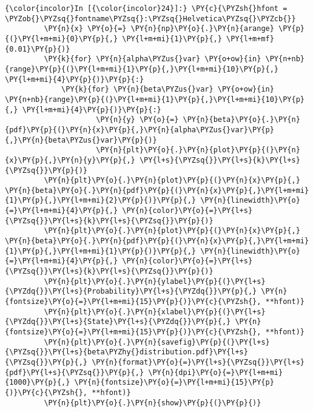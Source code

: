     \begin{Verbatim}[commandchars=\\\{\}]
{\color{incolor}In [{\color{incolor}24}]:} \PY{c}{\PYZsh{}hfont = \PYZob{}\PYZsq{}fontname\PYZsq{}:\PYZsq{}Helvetica\PYZsq{}\PYZcb{}}
         \PY{n}{x} \PY{o}{=} \PY{n}{np}\PY{o}{.}\PY{n}{arange} \PY{p}{(}\PY{l+m+mi}{0}\PY{p}{,} \PY{l+m+mi}{1}\PY{p}{,} \PY{l+m+mf}{0.01}\PY{p}{)}
         \PY{k}{for} \PY{n}{alpha\PYZus{}var} \PY{o+ow}{in} \PY{n+nb}{range}\PY{p}{(}\PY{l+m+mi}{1}\PY{p}{,}\PY{l+m+mi}{10}\PY{p}{,} \PY{l+m+mi}{4}\PY{p}{)}\PY{p}{:}
             \PY{k}{for} \PY{n}{beta\PYZus{}var} \PY{o+ow}{in} \PY{n+nb}{range}\PY{p}{(}\PY{l+m+mi}{1}\PY{p}{,}\PY{l+m+mi}{10}\PY{p}{,} \PY{l+m+mi}{4}\PY{p}{)}\PY{p}{:}
                     \PY{n}{y} \PY{o}{=} \PY{n}{beta}\PY{o}{.}\PY{n}{pdf}\PY{p}{(}\PY{n}{x}\PY{p}{,}\PY{n}{alpha\PYZus{}var}\PY{p}{,}\PY{n}{beta\PYZus{}var}\PY{p}{)}
                     \PY{n}{plt}\PY{o}{.}\PY{n}{plot}\PY{p}{(}\PY{n}{x}\PY{p}{,}\PY{n}{y}\PY{p}{,} \PY{l+s}{\PYZsq{}}\PY{l+s}{k}\PY{l+s}{\PYZsq{}}\PY{p}{)}
         \PY{n}{plt}\PY{o}{.}\PY{n}{plot}\PY{p}{(}\PY{n}{x}\PY{p}{,} \PY{n}{beta}\PY{o}{.}\PY{n}{pdf}\PY{p}{(}\PY{n}{x}\PY{p}{,}\PY{l+m+mi}{1}\PY{p}{,}\PY{l+m+mi}{2}\PY{p}{)}\PY{p}{,} \PY{n}{linewidth}\PY{o}{=}\PY{l+m+mi}{4}\PY{p}{,} \PY{n}{color}\PY{o}{=}\PY{l+s}{\PYZsq{}}\PY{l+s}{k}\PY{l+s}{\PYZsq{}}\PY{p}{)}
         \PY{n}{plt}\PY{o}{.}\PY{n}{plot}\PY{p}{(}\PY{n}{x}\PY{p}{,} \PY{n}{beta}\PY{o}{.}\PY{n}{pdf}\PY{p}{(}\PY{n}{x}\PY{p}{,}\PY{l+m+mi}{1}\PY{p}{,}\PY{l+m+mi}{1}\PY{p}{)}\PY{p}{,} \PY{n}{linewidth}\PY{o}{=}\PY{l+m+mi}{4}\PY{p}{,} \PY{n}{color}\PY{o}{=}\PY{l+s}{\PYZsq{}}\PY{l+s}{k}\PY{l+s}{\PYZsq{}}\PY{p}{)}
         \PY{n}{plt}\PY{o}{.}\PY{n}{ylabel}\PY{p}{(}\PY{l+s}{\PYZdq{}}\PY{l+s}{Probability}\PY{l+s}{\PYZdq{}}\PY{p}{,} \PY{n}{fontsize}\PY{o}{=}\PY{l+m+mi}{15}\PY{p}{)}\PY{c}{\PYZsh{}, **hfont)}
         \PY{n}{plt}\PY{o}{.}\PY{n}{xlabel}\PY{p}{(}\PY{l+s}{\PYZdq{}}\PY{l+s}{State}\PY{l+s}{\PYZdq{}}\PY{p}{,} \PY{n}{fontsize}\PY{o}{=}\PY{l+m+mi}{15}\PY{p}{)}\PY{c}{\PYZsh{}, **hfont)}
         \PY{n}{plt}\PY{o}{.}\PY{n}{savefig}\PY{p}{(}\PY{l+s}{\PYZsq{}}\PY{l+s}{beta\PYZhy{}distribution.pdf}\PY{l+s}{\PYZsq{}}\PY{p}{,} \PY{n}{format}\PY{o}{=}\PY{l+s}{\PYZsq{}}\PY{l+s}{pdf}\PY{l+s}{\PYZsq{}}\PY{p}{,} \PY{n}{dpi}\PY{o}{=}\PY{l+m+mi}{1000}\PY{p}{,} \PY{n}{fontsize}\PY{o}{=}\PY{l+m+mi}{15}\PY{p}{)}\PY{c}{\PYZsh{}, **hfont)}
         \PY{n}{plt}\PY{o}{.}\PY{n}{show}\PY{p}{(}\PY{p}{)}
\end{Verbatim}

    \begin{center}
    \end{center}
    { \hspace*{\fill} \\}
    
